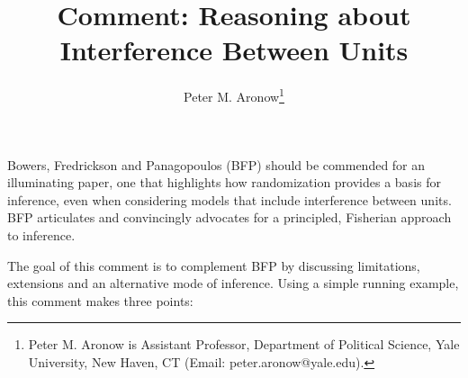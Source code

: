 \documentclass[12pt]{article}
\newcommand{\0}{\mathbf{0}}
\begin{document}
\sloppy

\addtolength{\topmargin}{-.025in}
\addtolength{\textheight}{.05in}



\author{Peter M. Aronow\thanks{Peter M. Aronow is Assistant Professor, Department of Political Science, Yale University, New Haven, CT (Email: peter.aronow@yale.edu).}}


\title{Comment: Reasoning about Interference Between Units}
\maketitle



Bowers, Fredrickson and Panagopoulos (BFP) should be commended for an illuminating paper, one that highlights how randomization provides a basis for inference, even when considering models that include interference between units. BFP articulates and convincingly advocates for a principled, Fisherian approach to inference. 

The goal of this comment is to complement BFP by discussing limitations, extensions and an alternative mode of inference. Using a simple running example, 
this comment makes three points:
\end{document}
